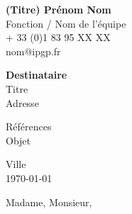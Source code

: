 \documentclass{lettreIPGP}
\begin{document}

\putlogo

{\bfseries (Titre) Prénom Nom}\\
Fonction / Nom de l’équipe\\
\myaddr
{\color{darkgray}
+ 33 (0)1 83 95 XX XX    %
\\
nom@ipgp.fr
}

\hspace*{\fill}\begin{minipage}{5cm}
{\bfseries Destinataire}\\
Titre\\
Adresse
\end{minipage}

Références\\
Objet

\begin{flushright}
Ville\\
\today
\end{flushright}

Madame, Monsieur,

\vspace*{3mm}

\lipsum[1-10]

\vspace{1.5cm}

\end{document}
